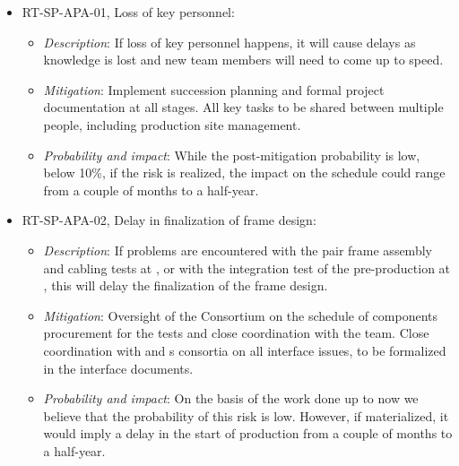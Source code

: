 \begin{itemize}
\item RT-SP-APA-01, Loss of key personnel:
\begin{itemize} %
\item \textit{Description}: If loss of key personnel happens, it will cause delays as knowledge is lost and new team members will need to come up to speed.
\item \textit{Mitigation}: Implement succession planning and formal project documentation at all stages. All key tasks to be shared between multiple people, including production site management.
\item \textit{Probability and impact}: While the post-mitigation probability is low, below 10\%, if the risk is realized, the impact on the schedule could range from a couple of months to a half-year.
\end{itemize}

\item RT-SP-APA-02, Delay in finalization of  frame design:
\begin{itemize} %
\item \textit{Description}: If problems are encountered with the  pair %
frame assembly and cabling tests at , or with the integration test of the pre-production  at , this will delay the finalization of the  frame design.
\item \textit{Mitigation}: Oversight of the  Consortium on the schedule of components procurement for the  tests and close coordination with the  team. Close coordination with  and s consortia on all interface issues, to be formalized in the interface documents.
\item \textit{Probability and impact}: On the basis of the work done up to now we believe that the probability of this risk is low. However, if materialized, it would imply a delay in the start of  production from a couple of months to a half-year.
\end{itemize}


\end{itemize}
